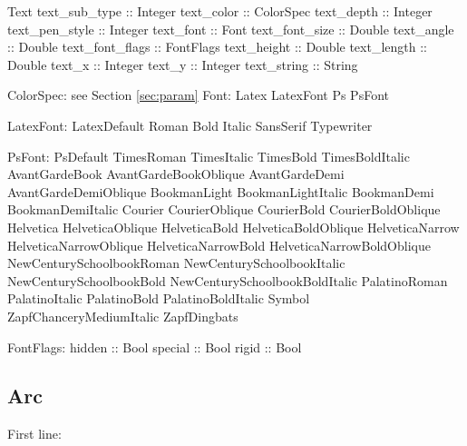 \documentclass[10pt, a4paper]{article}
\begin{document}
Text	 
text\_sub\_type :: Integer
text\_color :: ColorSpec
text\_depth :: Integer
text\_pen\_style :: Integer
text\_font :: Font
text\_font\_size :: Double
text\_angle :: Double
text\_font\_flags :: FontFlags
text\_height :: Double
text\_length :: Double
text\_x :: Integer
text\_y :: Integer
text\_string :: String

ColorSpec: see Section \ref{sec:param}
Font:
Latex LatexFont	 
Ps PsFont	 


LatexFont:
LatexDefault	 
Roman	 
Bold	 
Italic	 
SansSerif	 
Typewriter	 


PsFont:
PsDefault	 
TimesRoman	 
TimesItalic	 
TimesBold	 
TimesBoldItalic	 
AvantGardeBook	 
AvantGardeBookOblique	 
AvantGardeDemi	 
AvantGardeDemiOblique	 
BookmanLight	 
BookmanLightItalic	 
BookmanDemi	 
BookmanDemiItalic	 
Courier	 
CourierOblique	 
CourierBold	 
CourierBoldOblique	 
Helvetica	 
HelveticaOblique	 
HelveticaBold	 
HelveticaBoldOblique	 
HelveticaNarrow	 
HelveticaNarrowOblique	 
HelveticaNarrowBold	 
HelveticaNarrowBoldOblique	 
NewCenturySchoolbookRoman	 
NewCenturySchoolbookItalic	 
NewCenturySchoolbookBold	 
NewCenturySchoolbookBoldItalic	 
PalatinoRoman	 
PalatinoItalic	 
PalatinoBold	 
PalatinoBoldItalic	 
Symbol	 
ZapfChanceryMediumItalic	 
ZapfDingbats	 


FontFlags:
hidden :: Bool
special :: Bool
rigid :: Bool





\subsection{Arc}\label{subsec:arc}

First line:
\end{document}
